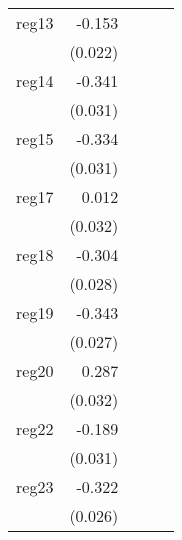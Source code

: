 {\begin{longtable}{l*{4}{D{.}{.}{-1}}}
\addlinespace
reg13       &      -0.153\sym{***}&                     &                     &                     \\
            &     (0.022)         &                     &                     &                     \\
\addlinespace
reg14       &      -0.341\sym{***}&                     &                     &                     \\
            &     (0.031)         &                     &                     &                     \\
\addlinespace
reg15       &      -0.334\sym{***}&                     &                     &                     \\
            &     (0.031)         &                     &                     &                     \\
\addlinespace
reg17       &       0.012         &                     &                     &                     \\
            &     (0.032)         &                     &                     &                     \\
\addlinespace
reg18       &      -0.304\sym{***}&                     &                     &                     \\
            &     (0.028)         &                     &                     &                     \\
\addlinespace
reg19       &      -0.343\sym{***}&                     &                     &                     \\
            &     (0.027)         &                     &                     &                     \\
\addlinespace
reg20       &       0.287\sym{***}&                     &                     &                     \\
            &     (0.032)         &                     &                     &                     \\
\addlinespace
reg22       &      -0.189\sym{***}&                     &                     &                     \\
            &     (0.031)         &                     &                     &                     \\
\addlinespace
reg23       &      -0.322\sym{***}&                     &                     &                     \\
            &     (0.026)         &                     &                     &                     \\

\end{longtable}}

